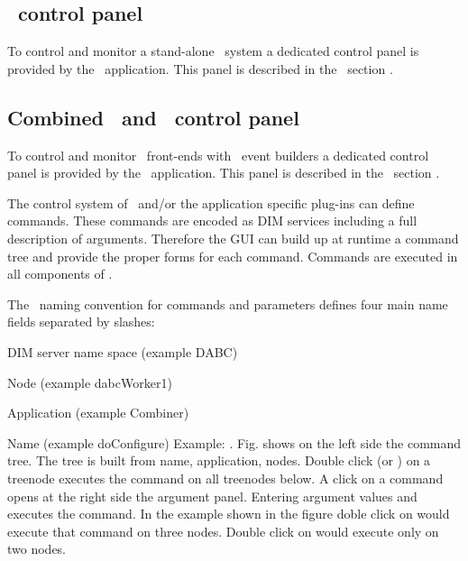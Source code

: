 {\subsection[MBS control panel]{\mbs\ control panel}
To control and monitor a stand-alone \mbs\ system a dedicated control
panel is provided by the \mbs\ application.
This panel is described in the \mbs\ section .

\subsection[Combined DABC and MBS control panel]{Combined \dabc\ and \mbs\ control panel}
To control and monitor \mbs\ front-ends with \dabc\ event builders a dedicated control
panel is provided by the \mbs\ application.
This panel is described in the \mbs\ section .

The control system of \dabc\ and/or the application specific plug-ins
can define commands. These commands are encoded as DIM services
including a full description of arguments. Therefore the GUI
can build up at runtime a command tree and provide the proper forms for
each command. Commands are executed in all components of \dabc.

The \dabc\ naming convention for commands and parameters defines four main name fields
separated by slashes:
\bnum
\item DIM server name space (example DABC)
\item Node (example dabcWorker1)
\item Application (example Combiner)
\item Name (example doConfigure)
\enum 
Example: .
Fig.  shows
on the left side the command tree. The tree is built
from name, application, nodes. Double click (or ) on a treenode
executes the command on all treenodes below.
A click on a command opens at the right side the argument panel.
Entering argument values and  executes the command.
In the example shown in the figure doble click on 
would execute that command on three nodes.
Double click on  would execute only on two nodes. 

}
